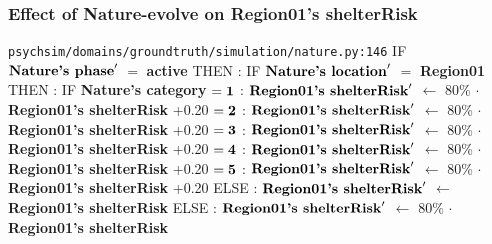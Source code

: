 \documentclass{article}%
\begin{document}
\subsubsection{Effect of Nature{-}evolve on Region01's shelterRisk}%
\label{ssubsec:Effect of Nature{-}evolve on Region01's shelterRisk}%
\begin{flushleft}%
\verb|psychsim/domains/groundtruth/simulation/nature.py:146|%
\linebreak%
IF %
$\mbox{\textbf{Nature's phase}} '$%
$=$%
\textbf{active}%
\linebreak%
\hspace*{2em}%
THEN %
: %
IF %
$\mbox{\textbf{Nature's location}} '$%
$=$%
\textbf{Region01}%
\linebreak%
\hspace*{4em}%
THEN %
: %
IF %
\textbf{Nature's category}%
\linebreak%
\hspace*{6em}%
$= \mbox{\textbf{1}}$%
: %
$\mbox{\textbf{Region01's shelterRisk}} '$%
$\leftarrow$%
80\%%
$\cdot$%
\textbf{Region01's shelterRisk}%
+0.20%
\linebreak%
\hspace*{6em}%
$= \mbox{\textbf{2}}$%
: %
$\mbox{\textbf{Region01's shelterRisk}} '$%
$\leftarrow$%
80\%%
$\cdot$%
\textbf{Region01's shelterRisk}%
+0.20%
\linebreak%
\hspace*{6em}%
$= \mbox{\textbf{3}}$%
: %
$\mbox{\textbf{Region01's shelterRisk}} '$%
$\leftarrow$%
80\%%
$\cdot$%
\textbf{Region01's shelterRisk}%
+0.20%
\linebreak%
\hspace*{6em}%
$= \mbox{\textbf{4}}$%
: %
$\mbox{\textbf{Region01's shelterRisk}} '$%
$\leftarrow$%
80\%%
$\cdot$%
\textbf{Region01's shelterRisk}%
+0.20%
\linebreak%
\hspace*{6em}%
$= \mbox{\textbf{5}}$%
: %
$\mbox{\textbf{Region01's shelterRisk}} '$%
$\leftarrow$%
80\%%
$\cdot$%
\textbf{Region01's shelterRisk}%
+0.20%
\linebreak%
\hspace*{4em}%
ELSE %
: %
$\mbox{\textbf{Region01's shelterRisk}} '$%
$\leftarrow$%
\textbf{Region01's shelterRisk}%
\linebreak%
\hspace*{2em}%
ELSE %
: %
$\mbox{\textbf{Region01's shelterRisk}} '$%
$\leftarrow$%
80\%%
$\cdot$%
\textbf{Region01's shelterRisk}%
\end{flushleft}
\end{document}
